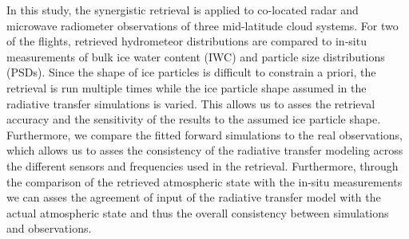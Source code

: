 \documentclass[journal abbreviation, manuscript]{copernicus}
\begin{document}


In this study, the synergistic retrieval is applied to co-located radar and
microwave radiometer observations of three mid-latitude cloud systems. For two
of the flights, retrieved hydrometeor distributions are compared to in-situ
measurements of bulk ice water content (IWC) and particle size distributions
(PSDs). Since the shape of ice particles is difficult to constrain a priori, the
retrieval is run multiple times while the ice particle shape assumed in the
radiative transfer simulations is varied. This allows us to asses the retrieval
accuracy and the sensitivity of the results to the assumed ice particle shape.
Furthermore, we compare the fitted forward simulations to the real observations,
which allows us to asses the consistency of the radiative transfer modeling
across the different sensors and frequencies used in the retrieval. Furthermore,
through the comparison of the retrieved atmospheric state with the in-situ
measurements we can asses the agreement of input of the radiative transfer model
with the actual atmospheric state and thus the overall consistency between
simulations and observations.
\end{document}
